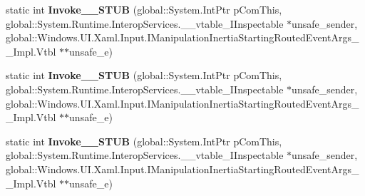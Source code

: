 \begin{DoxyCompactItemize}
\item 
\mbox{\label{struct_windows_1_1_u_i_1_1_xaml_1_1_input_1_1_manipulation_inertia_starting_event_handler_____impl_1_1_vtbl_aeab7f03cb9367b8c9f940ef7db5c1a4e}} 
static int {\bfseries Invoke\+\_\+\+\_\+\+S\+T\+UB} (global\+::\+System.\+Int\+Ptr p\+Com\+This, global\+::\+System.\+Runtime.\+Interop\+Services.\+\_\+\+\_\+vtable\+\_\+\+I\+Inspectable $\ast$unsafe\+\_\+sender, global\+::\+Windows.\+U\+I.\+Xaml.\+Input.\+I\+Manipulation\+Inertia\+Starting\+Routed\+Event\+Args\+\_\+\+\_\+\+Impl.\+Vtbl $\ast$$\ast$unsafe\+\_\+e)
\item 
\mbox{\label{struct_windows_1_1_u_i_1_1_xaml_1_1_input_1_1_manipulation_inertia_starting_event_handler_____impl_1_1_vtbl_aeab7f03cb9367b8c9f940ef7db5c1a4e}} 
static int {\bfseries Invoke\+\_\+\+\_\+\+S\+T\+UB} (global\+::\+System.\+Int\+Ptr p\+Com\+This, global\+::\+System.\+Runtime.\+Interop\+Services.\+\_\+\+\_\+vtable\+\_\+\+I\+Inspectable $\ast$unsafe\+\_\+sender, global\+::\+Windows.\+U\+I.\+Xaml.\+Input.\+I\+Manipulation\+Inertia\+Starting\+Routed\+Event\+Args\+\_\+\+\_\+\+Impl.\+Vtbl $\ast$$\ast$unsafe\+\_\+e)
\item 
\mbox{\label{struct_windows_1_1_u_i_1_1_xaml_1_1_input_1_1_manipulation_inertia_starting_event_handler_____impl_1_1_vtbl_aeab7f03cb9367b8c9f940ef7db5c1a4e}} 
static int {\bfseries Invoke\+\_\+\+\_\+\+S\+T\+UB} (global\+::\+System.\+Int\+Ptr p\+Com\+This, global\+::\+System.\+Runtime.\+Interop\+Services.\+\_\+\+\_\+vtable\+\_\+\+I\+Inspectable $\ast$unsafe\+\_\+sender, global\+::\+Windows.\+U\+I.\+Xaml.\+Input.\+I\+Manipulation\+Inertia\+Starting\+Routed\+Event\+Args\+\_\+\+\_\+\+Impl.\+Vtbl $\ast$$\ast$unsafe\+\_\+e)
\item 
\mbox{\label{struct_windows_1_1_u_i_1_1_xaml_1_1_input_1_1_manipulation_inertia_starting_event_handler_____impl_1_1_vtbl_aeab7f03cb9367b8c9f940ef7db5c1a4e}} 
$$
\end{DoxyCompactItemize}
